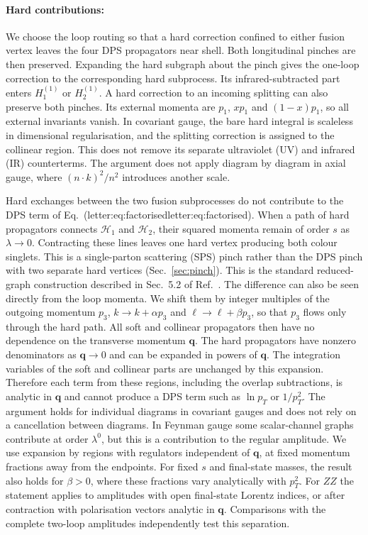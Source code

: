 \documentclass[%
 onecolumn,
 superscriptaddress,
 preprintnumbers,
 nofootinbib,
 amsmath,amssymb,
 aps,
 prl,
]{revtex4-2}
\newcommand{\qq}{\boldsymbol q}
\newcommand{\Lref}[1]{\ifcsname letter:#1\endcsname\csname letter:#1\endcsname\else\errmessage{The Letter has no label #1 (run letter_labels.py)}\fi}
\begin{document}
\paragraph{Hard contributions: }
We choose the loop routing so that a hard
correction confined to either fusion vertex
leaves the four DPS propagators near shell.
Both longitudinal pinches are then preserved.
Expanding the hard subgraph about the pinch
gives the one-loop correction to the corresponding
hard subprocess. Its infrared-subtracted part
enters $H_1^{(1)}$ or $H_2^{(1)}$.
%
A hard correction to an incoming splitting
can also preserve both pinches. Its external
momenta are $p_1$, $xp_1$ and $(1-x)p_1$,
so all external invariants vanish. In
covariant gauge, the bare hard integral is
scaleless in dimensional regularisation,
and the splitting correction is assigned
to the collinear region. This does not remove
its separate ultraviolet (UV) and infrared (IR)
counterterms. The argument does not apply
diagram by diagram in axial gauge, where
$(n\cdot k)^2/n^2$ introduces another scale.

Hard exchanges between the two fusion
subprocesses do not contribute to the DPS term
of Eq.~(\Lref{eq:factorised}). When a path of
hard propagators connects $\mathcal H_1$ and
$\mathcal H_2$, their squared momenta remain
of order $s$ as $\lambda\to0$. Contracting
these lines leaves one hard vertex producing
both colour singlets. This is a single-parton
scattering (SPS) pinch rather than the DPS
pinch with two separate hard vertices
(Sec.~\ref{sec:pinch}). This is the standard
reduced-graph construction described in
Sec.~5.2 of Ref.~\cite{Collins:2011zzd}.
%
The difference can also be seen directly
from the loop momenta. We shift them by
integer multiples of the outgoing momentum
$p_3$, $k\to k+\alpha p_3$ and
$\ell\to\ell+\beta p_3$, so that $p_3$ flows
only through the hard path. All soft and
collinear propagators then have no dependence
on the transverse momentum $\qq$.
The hard propagators have nonzero denominators
as $\qq\to0$ and can be expanded in powers
of $\qq$. The integration variables of the
soft and collinear parts are unchanged by
this expansion. Therefore each term from
these regions, including the overlap
subtractions, is analytic in $\qq$ and
cannot produce a DPS term such as
$\ln p_T$ or $1/p_T^2$.
%
The argument holds for individual diagrams
in covariant gauges and does not rely on a
cancellation between diagrams. In Feynman
gauge some scalar-channel graphs contribute
at order $\lambda^0$, but this is a
contribution to the regular amplitude.
We use expansion by regions with regulators
independent of $\qq$, at fixed momentum
fractions away from the endpoints.
For fixed $s$ and final-state masses,
the result also holds for $\beta>0$, where
these fractions vary analytically with $p_T^2$.
For $ZZ$ the statement applies to amplitudes
with open final-state Lorentz indices, or
after contraction with polarisation vectors
analytic in $\qq$. Comparisons with the
complete two-loop amplitudes independently
test this separation.
\end{document}
